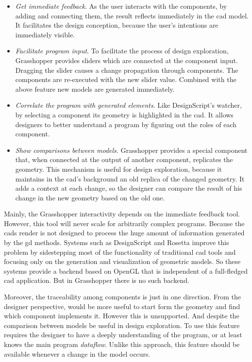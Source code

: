\begin{itemize}
 \item \textit{Get immediate feedback}. As the user interacts with the components, by adding and connecting them, the result reflects immediately in the \ac{cad} model. It facilitates the design conception, because the user's intentions are immediately visible. 
 \item \textit{Facilitate program input}. To facilitate the process of design exploration, Grasshopper provides sliders which are connected at the component input. Dragging the slider causes a change propagation through components. The components are re-executed with the new slider value. Combined with the above feature new models are generated immediately.
 \item \textit{Correlate the program with generated elements}. Like DesignScript's watcher, by selecting a component its geometry is highlighted in the \ac{cad}. It allows designers to better understand a program by figuring out the roles of each component.
 \item \textit{Show comparisons between models}. Grasshopper provides a special component that, when connected at the output of another component, replicates the geometry. This mechanism is useful for design exploration, because it maintains in the \ac{cad}'s background an old replica of the changed geometry. It adds a context at each change, so the designer can compare the result of his change in the new geometry based on the old one.
\end{itemize}

Mainly, the Grasshopper interactivity depends on the immediate feedback tool. However, this tool will never scale for arbitrarily complex programs. Because the \ac{cad}s render is not designed to process the huge amount of information generated by the \ac{gd} methods. Systems such as DesignScript and Rosetta improve this problem by sidestepping most of the functionality of traditional \ac{cad} tools and focusing only on the generation and visualization of geometric models. So these systems provide a backend based on OpenGL that is independent of a full-fledged \ac{cad} application. But in Grasshopper there is no such backend.

Moreover, the traceability among components is just in one direction. From the designer perspective, would be more useful to start form the geometry and find which component implements it. However this is unsupported. And despite the comparison between models be useful in design exploration. To use this feature requires the designer to have a deeply understanding of the program, or at least knows the main program \textit{dataflow}. Unlike this approach, this feature should be available whenever a change in the model occurs.
